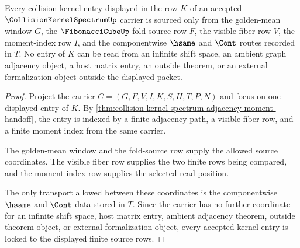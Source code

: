 \begin{theorem}
\label{thm:collision-kernel-spectrum-kernel-entry-source-lock}
Every collision-kernel entry displayed in the row $K$ of an accepted $\CollisionKernelSpectrumUp$ carrier is sourced only from the golden-mean window $G$, the $\FibonacciCubeUp$ fold-source row $F$, the visible fiber row $V$, the moment-index row $I$, and the componentwise $\hsame$ and $\Cont$ routes recorded in $T$. No entry of $K$ can be read from an infinite shift space, an ambient graph adjacency object, a host matrix entry, an outside theorem, or an external formalization object outside the displayed packet.
\end{theorem}
\begin{proof}
Project the carrier $C=(G,F,V,I,K,S,H,T,P,N)$ and focus on one displayed entry of $K$. By \autoref{thm:collision-kernel-spectrum-adjacency-moment-handoff}, the entry is indexed by a finite adjacency path, a visible fiber row, and a finite moment index from the same carrier.

The golden-mean window and the fold-source row supply the allowed source coordinates. The visible fiber row supplies the two finite rows being compared, and the moment-index row supplies the selected read position.

The only transport allowed between these coordinates is the componentwise $\hsame$ and $\Cont$ data stored in $T$. Since the carrier has no further coordinate for an infinite shift space, host matrix entry, ambient adjacency theorem, outside theorem object, or external formalization object, every accepted kernel entry is locked to the displayed finite source rows.
\end{proof}


